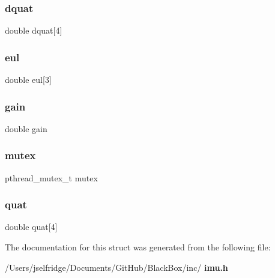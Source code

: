 \subsubsection{dquat}
{\footnotesize\ttfamily double dquat[4]}

\mbox{\label{structimu__ahrs__struct_a57a30c147dcd2be4bf9fa3dea558490c}} 
\subsubsection{eul}
{\footnotesize\ttfamily double eul[3]}

\mbox{\label{structimu__ahrs__struct_ac7b389a0254ed87600f959a5f6d58ab0}} 
\subsubsection{gain}
{\footnotesize\ttfamily double gain}

\mbox{\label{structimu__ahrs__struct_a4acff8232e4aec9cd5c6dc200ac55ef3}} 
\subsubsection{mutex}
{\footnotesize\ttfamily pthread\+\_\+mutex\+\_\+t mutex}

\mbox{\label{structimu__ahrs__struct_a1070e83d79ec69ca3e161198cfe575cb}} 
\subsubsection{quat}
{\footnotesize\ttfamily double quat[4]}



The documentation for this struct was generated from the following file\+:\begin{DoxyCompactItemize}
\item 
/\+Users/jselfridge/\+Documents/\+Git\+Hub/\+Black\+Box/inc/\textbf{ imu.\+h}\end{DoxyCompactItemize}
